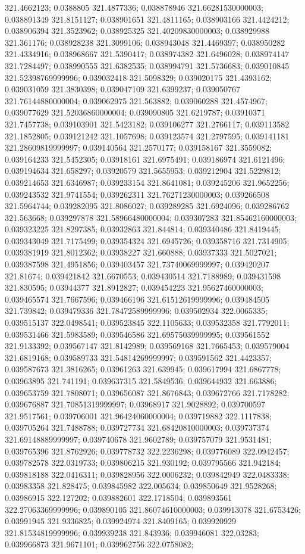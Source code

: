 321.4662123; 0.0388805 321.4877336; 0.038878946 321.66281530000003; 0.038891349 321.8151127; 0.038901651 321.4811165; 0.038903166 321.4424212; 0.038906394 321.3523962; 0.038925325 321.40209830000003; 0.038929988 321.361176; 0.038928238 321.3099106; 0.038943048 321.4469397; 0.038950282 321.4334916; 0.038968667 321.5390417; 0.038974382 321.6496028; 0.038974147 321.7284497; 0.038990555 321.6382535; 0.038994791 321.5736683; 0.039010845 321.52398769999996; 0.039032418 321.5098329; 0.039020175 321.4393162; 0.039031059 321.3830398; 0.039047109 321.6399237; 0.039050767 321.76144880000004; 0.039062975 321.563882; 0.039060288 321.4574967; 0.039077629 321.52036860000004; 0.039090805 321.6219787; 0.03910371 321.7457738; 0.039103901 321.5423182; 0.039106277 321.2766117; 0.039113582 321.1852805; 0.039121242 321.1057698; 0.039123574 321.2797595; 0.039141181 321.28609819999997; 0.039140564 321.2570177; 0.039158167 321.3559082; 0.039164233 321.5452305; 0.03918161 321.6975491; 0.039186974 321.6121496; 0.039194634 321.658297; 0.03920579 321.5655953; 0.039212904 321.5229812; 0.039214653 321.6346987; 0.039233154 321.8641081; 0.039245206 321.9652256; 0.039243532 321.9741554; 0.039262311 321.76271230000003; 0.039266508 321.5964744; 0.039282095 321.8086027; 0.039289285 321.6924096; 0.039286762 321.563668; 0.039297878 321.58966480000004; 0.039307283 321.85462160000003; 0.039323225 321.8297385; 0.03932863 321.844814; 0.039340486 321.8419445; 0.039343049 321.7175499; 0.039354324 321.6945726; 0.039358716 321.7314905; 0.039381919 321.8012362; 0.03938227 321.660888; 0.03937333 321.5027021; 0.039387598 321.4951856; 0.039403457 321.73740069999997; 0.039420207 321.81674; 0.039421842 321.6670553; 0.039430514 321.7188989; 0.039431598 321.830595; 0.03944377 321.8912827; 0.039454223 321.95627460000003; 0.039465574 321.7667596; 0.039466196 321.61512619999996; 0.039484505 321.739842; 0.039479336 321.78472589999996; 0.039502934 322.0065335; 0.039515137 322.0498541; 0.039523845 322.1105633; 0.039532358 321.7792011; 0.039531466 321.5983589; 0.039546586 321.69575039999995; 0.039561552 321.9133392; 0.039567147 321.8142989; 0.039569168 321.7665453; 0.039579004 321.6819168; 0.039589733 321.54814269999997; 0.039591562 321.4423357; 0.039587673 321.3816265; 0.03961263 321.639945; 0.039617994 321.6867778; 0.03963895 321.741191; 0.039637315 321.5849536; 0.039644932 321.663886; 0.039653759 321.7808071; 0.039656087 321.8676843; 0.039672766 321.7178282; 0.039676887 321.70851319999997; 0.03968917 321.9028892; 0.039700597 321.9517561; 0.039706001 321.96424060000004; 0.039719882 322.1117838; 0.039705264 321.7488788; 0.039727734 321.68420810000003; 0.039737374 321.69148889999997; 0.039740678 321.9602789; 0.039757079 321.9531481; 0.039765396 321.8762926; 0.039778732 322.2236298; 0.039776089 322.0942457; 0.039782578 322.0319733; 0.039806215 321.930192; 0.039795566 321.942184; 0.039818188 322.0416311; 0.039828956 322.0006232; 0.039842949 322.0483338; 0.03983358 321.828475; 0.039845982 322.005634; 0.039850649 321.9528268; 0.03986915 322.127202; 0.039882601 322.1718504; 0.039893561 322.27063369999996; 0.039890105 321.86074610000003; 0.039913078 321.6753426; 0.03991945 321.9336825; 0.039924974 321.8409165; 0.039920929 321.81534819999996; 0.039939238 321.843936; 0.039946081 322.03283; 0.039966873 321.9671101; 0.039962756 322.0758082; 